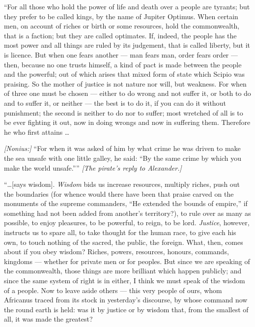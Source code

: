  ``For all those who hold the power of life and death over a people are tyrants; but they prefer to be called kings, by the name of Jupiter Optimus. When certain men, on account of riches or birth or some resources, hold the commonwealth, that is a faction; but they are called optimates. If, indeed, the people has the most power and all things are ruled by its judgement, that is called liberty, but it is licence. But when one fears another --- man fears man, order fears order --- then, because no one trusts himself, a kind of pact is made between the people and the powerful; out of which arises that mixed form of state which Scipio was praising. So the mother of justice is not nature nor will, but weakness. For when of three one must be chosen --- either to do wrong and not suffer it, or both to do and to suffer it, or neither --- the best is to do it, if you can do it without punishment; the second is neither to do nor to suffer; most wretched of all is to be ever fighting it out, now in doing wrongs and now in suffering them. Therefore he who first attains \ldots

 \textit{[Nonius:]} ``For when it was asked of him by what crime he was driven to make the sea unsafe with one little galley, he said: ``By the same crime by which you make the world unsafe.'''' \textit{[The pirate's reply to Alexander.]}

 ``\ldots [says wisdom]. \textit{Wisdom} bids us increase resources, multiply riches, push out the boundaries (for whence would there have been that praise carved on the monuments of the supreme commanders, ``He extended the bounds of empire,'' if something had not been added from another's territory?), to rule over as many as possible, to enjoy pleasures, to be powerful, to reign, to be lord. \textit{Justice}, however, instructs us to spare all, to take thought for the human race, to give each his own, to touch nothing of the sacred, the public, the foreign. What, then, comes about if you obey wisdom? Riches, powers, resources, honours, commands, kingdoms --- whether for private men or for peoples. But since we are speaking of the commonwealth, those things are more brilliant which happen publicly; and since the same system of right is in either, I think we must speak of the wisdom of a people. Now to leave aside others --- this very people of ours, whom Africanus traced from its stock in yesterday's discourse, by whose command now the round earth is held: was it by justice or by wisdom that, from the smallest of all, it was made the greatest?

